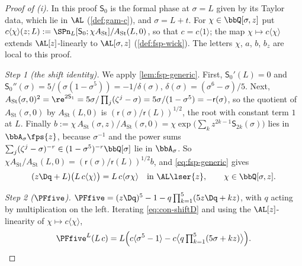 \begin{proof}[Proof of (i)]
In this proof $\mathsf S_0$ is the formal phase at $\sigma=L$ given by its Taylor data, which lie in $\AL$ (\cref{def:gam-c}), and $\sigma=L+t$. For $\chi\in\bbQ[\sigma,z]$ put $c\langle\chi\rangle(z;L):=\SPn_L[\mathsf S_0;\chi A_{\mathrm{St}}]/A_{\mathrm{St}}(L,0)$, so that $c=c\langle1\rangle$; the map $\chi\mapsto c\langle\chi\rangle$ extends $\AL[z]$-linearly to $\AL[\sigma,z]$ (\cref{def:fsp-wick}). The letters $\chi$, $a$, $b$, $b_z$ are local to this proof.

\emph{Step 1 (the shift identity).} We apply \cref{lem:fsp-generic}. First, $\mathsf S_0'(L)=0$ and $\mathsf S_0''(\sigma)=5/(\sigma(1-\sigma^5))=-1/\delta(\sigma)$, $\delta(\sigma)=(\sigma^6-\sigma)/5$. Next, $A_{\mathrm{St}}(\sigma,0)^2=\re^{2\mathsf S_1}=5\sigma/\prod_j(\zeta^j-\sigma)=5\sigma/(1-\sigma^5)=-\mathsf r(\sigma)$, so the quotient of $A_{\mathrm{St}}(\sigma,0)$ by $A_{\mathrm{St}}(L,0)$ is $(\mathsf r(\sigma)/\mathsf r(L))^{1/2}$, the root with constant term $1$ at $L$. Finally $b:=\chi\,A_{\mathrm{St}}(\sigma,z)/A_{\mathrm{St}}(\sigma,0)=\chi\exp\bigl(\sum_kz^{2k-1}\mathsf S_{2k}(\sigma)\bigr)$ lies in $\bbA_\sigma\fps{z}$, because $\sigma^{-1}$ and the power sums $\sum_j(\zeta^j-\sigma)^{-r}\in(1-\sigma^5)^{-r}\bbQ[\sigma]$ lie in $\bbA_\sigma$. So $\chi A_{\mathrm{St}}/A_{\mathrm{St}}(L,0)=(\mathsf r(\sigma)/\mathsf r(L))^{1/2}b$, and \eqref{eq:fsp-generic} gives
\begin{equation}
\label{eq:con-shiftD}
(z\Dq+L)\bigl(L\,c\langle\chi\rangle\bigr)=L\,c\langle\sigma\chi\rangle\quad\text{in }\AL\lser{z},\qquad\chi\in\bbQ[\sigma,z].
\end{equation}

\emph{Step 2 ($\PFfive$).} $\PFfive=(z\Dq)^5-1-q\prod_{k=1}^5(5z\Dq+kz)$, with $q$ acting by multiplication on the left. Iterating \eqref{eq:con-shiftD} and using the $\AL[z]$-linearity of $\chi\mapsto c\langle\chi\rangle$,
\[
\PFfive^{L}(L\,c)=L\Bigl(c\langle\sigma^5-1\rangle-c\bigl\langle q\textstyle\prod_{k=1}^5(5\sigma+kz)\bigr\rangle\Bigr).
\]


\end{proof}
